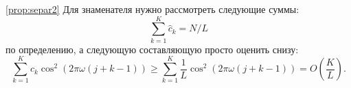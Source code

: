 \documentclass[12pt,a4paper,fleqn,leqno]{article}
\begin{document}
\begin{proof5}{\ref{prop:separ2}}
Для знаменателя нужно рассмотреть следующие суммы:
\begin{equation*}
\sum_{k=1}^K \hat c_k = N / L
\end{equation*}
по определению, а следующую составляющую просто оценить снизу:
\begin{equation*}
\sum_{k=1}^K \hat c_k\cos^2(2 \pi \omega (j + k - 1)) \ge \sum_{k=1}^K \frac{1}{L}\cos^2(2 \pi \omega (j + k - 1)) = O \left(\frac{K}{L} \right).
\end{equation*}
\end{proof5}
\end{document}
